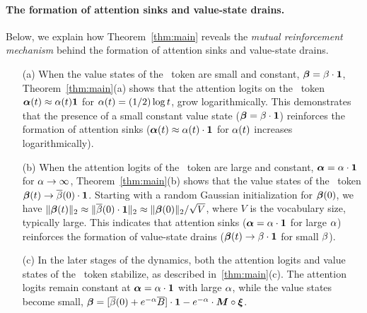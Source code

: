 \paragraph{The formation of attention sinks and value-state drains.} Below, we explain how Theorem~\ref{thm:main} reveals the \textit{mutual reinforcement mechanism} behind the formation of attention sinks and value-state drains.  
\begin{itemize}[leftmargin=2em]
\item[(a)] When the value states of the \bos~token are small and constant, $\boldsymbol{\beta} = \beta \cdot \bm{1}$, Theorem~\ref{thm:main}(a) shows that the attention logits on the \bos~token $\bm{\alpha}(t) \approx \alpha(t) \bm{1}$  for $\alpha(t) = (1/2) \log t$, grow logarithmically. This demonstrates that the presence of a small constant value state ($\boldsymbol{\beta} = \beta \cdot \bm{1}$) reinforces the formation of attention sinks ($\bm{\alpha}(t) \approx \alpha(t) \cdot \bm{1}$ for $\alpha(t)$ increases logarithmically). 
\item[(b)] When the attention logits of the \bos~token are large and constant, $\bm{\alpha} = \alpha \cdot \bm{1}$ for $\alpha \to \infty$, Theorem~\ref{thm:main}(b) shows that the value states of the \bos~token $\boldsymbol{\beta}(t) \to \overline{\beta}(0) \cdot \bm{1}$. Starting with a random Gaussian initialization for $\boldsymbol{\beta}(0)$, we have $\|\boldsymbol{\beta}(t)\|_2 \approx \|\overline{\beta}(0) \cdot \bm{1}\|_2 \approx \|\boldsymbol{\beta}(0)\|_2 / \sqrt{V}$, where $V$ is the vocabulary size, typically large. This indicates that attention sinks ($\bm{\alpha} = \alpha \cdot \bm{1}$ for large $\alpha$) reinforces the formation of value-state drains ($\boldsymbol{\beta}(t) \to \beta \cdot \bm{1}$ for small $\beta$). 
\item[(c)] In the later stages of the dynamics, both the attention logits and value states of the \bos~token stabilize, as described in~\ref{thm:main}(c). The attention logits remain constant at $\bm{\alpha} = \alpha \cdot \bm{1}$ with large $\alpha$, while the value states become small, $\boldsymbol{\beta} = [\overline{\beta}(0)+e^{-\alpha} \overline{B}] \cdot \bm{1} - e^{-\alpha} \cdot \bm{M}\circ \bm{\xi}$. 
\end{itemize}





